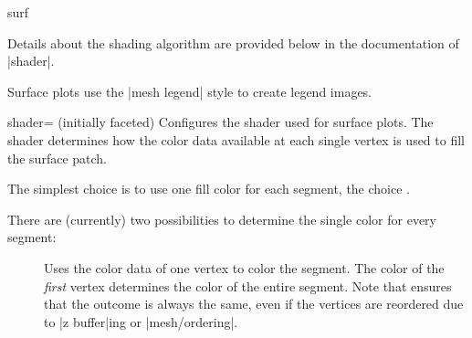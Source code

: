 {\begin{plottype}[/pgfplots]{surf}
\pgfplotsexpensiveexample
\begin{codeexample}[]
\end{codeexample}

    Details about the shading algorithm are provided below in the documentation
    of |shader|.

    Surface plots use the |mesh legend| style to create legend images.
\end{plottype}

\begin{pgfplotskey}{shader= (initially faceted)%
}
    Configures the shader used for surface plots. The shader determines how the
    color data available at each single vertex is used to fill the surface
    patch.

    The simplest choice is to use one fill color for each segment, the choice
    .

\pgfplotsexpensiveexample
\begin{codeexample}[]
\end{codeexample}

    \noindent There are (currently) two possibilities to determine the single
    color for every segment:
    \begin{description}
        \item[] Uses the color data of one vertex to
            color the segment. The color of the \emph{first} vertex
            determines the color of the entire segment. Note that \PGFPlots{}
            ensures that the outcome is always the same, even if the vertices
            are reordered due to |z buffer|ing or |mesh/ordering|.


\end{description}
\end{pgfplotskey}}

